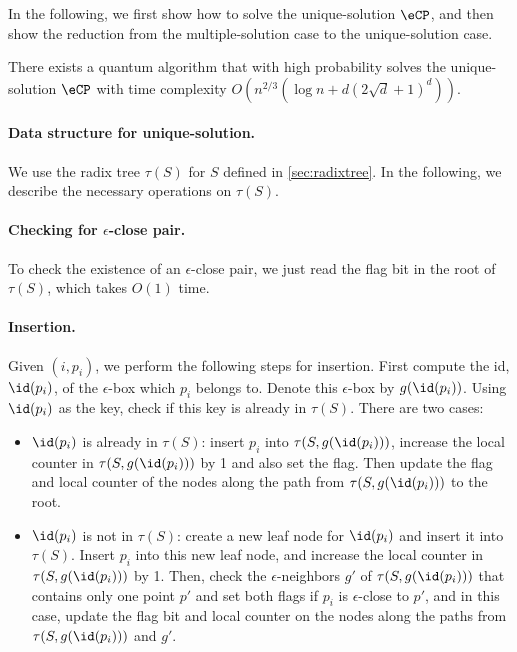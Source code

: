 In the following, we first show how to solve the unique-solution $\eCP$, and then show the reduction from the multiple-solution case to the unique-solution case. 
\begin{lemma}
  \label{lem:ecp-single-solution}
  There exists a quantum algorithm that with high probability solves the unique-solution $\eCP$ with time complexity $O(n^{2/3}(\log n + d(2\sqrt{d}+1)^d))$.
\end{lemma}


\paragraph{Data structure for unique-solution.}

We use the radix tree $\tau(S)$ for $S$ defined in \cref{sec:radixtree}. In the following, we describe the necessary operations on $\tau(S)$.

\paragraph{Checking for $\epsilon$-close pair.} To check the existence of an $\epsilon$-close pair, we just read the flag bit in the root of $\tau(S)$, which takes $O(1)$ time.

\paragraph{Insertion.} Given $(i, p_i)$, we perform the following steps for insertion. First compute the id, $\id(p_i)$, of the $\epsilon$-box which $p_i$ belongs to. Denote this $\epsilon$-box by $g(\id(p_i))$. Using $\id(p_i)$ as the key, check if this key is already in $\tau(S)$. There are two cases:
\begin{itemize}
  \item $\id(p_i)$ is already in $\tau(S)$: insert $p_i$ into $\tau(S, g(\id(p_i)))$, increase the local counter in $\tau(S, g(\id(p_i)))$ by 1 and also set the flag. Then update the flag and local counter of the nodes along the path from $\tau(S, g(\id(p_i)))$ to the root. 
  \item $\id(p_i)$ is not in $\tau(S)$: create a new leaf node for $\id(p_i)$ and insert it into $\tau(S)$. Insert $p_i$ into this new leaf node, and increase the local counter in $\tau(S, g(\id(p_i)))$ by 1. Then, check the $\epsilon$-neighbors $g'$ of $\tau(S, g(\id(p_i)))$ that contains only one point $p'$ and set both flags if $p_i$ is $\epsilon$-close to $p'$, and in this case, update the flag bit and local counter on the nodes along the paths from $\tau(S, g(\id(p_i)))$ and $g'$.
\end{itemize}

